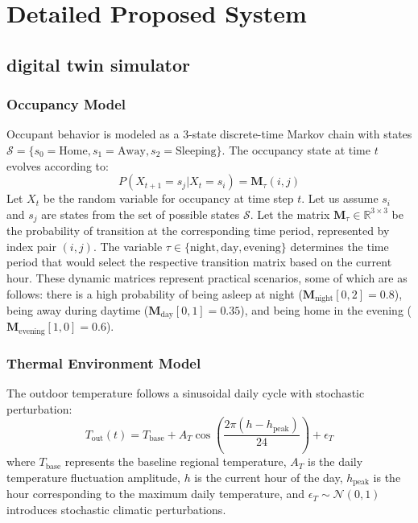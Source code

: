 \documentclass[journal]{IEEEtran}
\begin{document}
\section{Detailed Proposed System}

\subsection{digital twin simulator}

\subsubsection{Occupancy Model} Occupant behavior is modeled as a 3-state discrete-time Markov chain with states $\mathcal{S} = \{s_0 = \text{Home}, s_1 = \text{Away}, s_2 = \text{Sleeping}\}$. The occupancy state at time $t$ evolves according to:
\begin{equation}
    P(X_{t+1} = s_j | X_t = s_i) = \mathbf{M}_\tau(i, j)
    \label{eq:markov}
\end{equation}
Let $X_t$ be the random variable for occupancy at time step $t$. Let us assume $s_i$ and $s_j$ are states from the set of possible states $\mathcal{S}$. Let the matrix $\mathbf{M}_\tau \in \mathbb{R}^{3 \times 3}$ be the probability of transition at the corresponding time period, represented by index pair $(i, j)$. The variable $\tau \in \{\text{night}, \text{day}, \text{evening}\}$ determines the time period that would select the respective transition matrix based on the current hour. These dynamic matrices represent practical scenarios, some of which are as follows: there is a high probability of being asleep at night ($\mathbf{M}_{\text{night}}[0, 2] = 0.8$), being away during daytime ($\mathbf{M}_{\text{day}}[0, 1] = 0.35$), and being home in the evening ($\mathbf{M}_{\text{evening}}[1, 0] = 0.6$).

\subsubsection{Thermal Environment Model} The outdoor temperature follows a sinusoidal daily cycle with stochastic perturbation:
\begin{equation}
    T_{\text{out}}(t) = T_{\text{base}} + A_T \cos\left(\frac{2\pi(h-h_{\text{peak}})}{24}\right) + \epsilon_T
    \label{eq:outdoor_temp}
\end{equation}
where $T_{\text{base}}$ represents the baseline regional temperature, $A_T$ is the daily temperature fluctuation amplitude, $h$ is the current hour of the day, $h_{\text{peak}}$ is the hour corresponding to the maximum daily temperature, and $\epsilon_T \sim \mathcal{N}(0, 1)$ introduces stochastic climatic perturbations.
\end{document}
